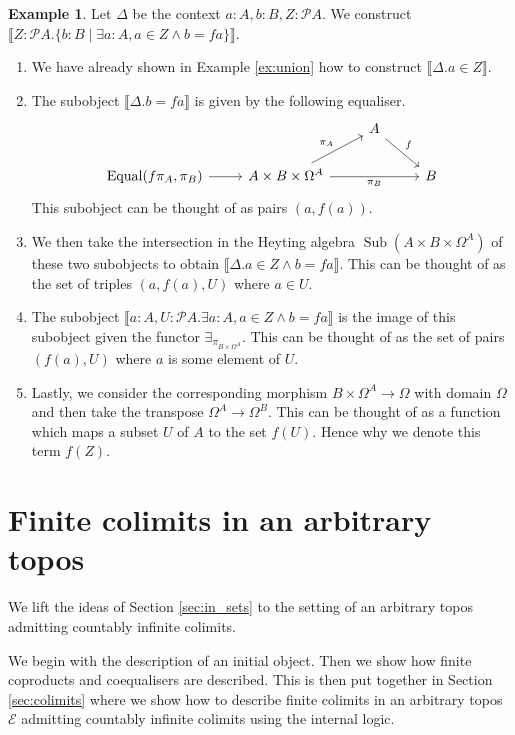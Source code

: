 \documentclass{birkjour}
\theoremstyle{plain}
\theoremstyle{definition}
\newtheorem{example}[thm]{Example}
\newcommand{\call}[1]{\mathcal{#1}}
\newcommand{\lto}{\longrightarrow}
\begin{document}
	\begin{example}
		Let $\Delta$ be the context $a:A, b:B, Z:\call{P}A$. We construct $ \llbracket Z:\call{P}A . \lbrace b:B \mid \exists a:A, a \in Z \wedge b = fa \rbrace\rrbracket$.
		\begin{enumerate}
			\item We have already shown in Example \ref{ex:union} how to construct $\llbracket \Delta. a \in Z\rrbracket$.
			\item The subobject $\llbracket \Delta. b = fa\rrbracket$ is given by the following equaliser.
			\begin{equation}
				\begin{tikzcd}
					& & A\arrow[dr,"{f}"]\\
					\operatorname{Equal}(f\pi_A, \pi_B)\arrow[r] & A \times B \times \Omega^A\arrow[ur,"{\pi_A}"]\arrow[rr,swap,"{\pi_B}"] & & B
				\end{tikzcd}
			\end{equation}
			This subobject can be thought of as pairs $(a,f(a))$.
			\item We then take the intersection in the Heyting algebra $\operatorname{Sub}(A \times B \times \Omega^A)$ of these two subobjects to obtain $\llbracket \Delta. a \in Z \wedge b = fa\rrbracket$. This can be thought of as the set of triples $(a,f(a),U)$ where $a \in U$.
			\item The subobject $\llbracket a:A, U: \call{P}A. \exists a:A, a \in Z \wedge b = fa\rrbracket$ is the image of this subobject given the functor $\exists_{\pi_{B \times \Omega^A}}$. This can be thought of as the set of pairs $(f(a),U)$ where $a$ is some element of $U$.
			\item Lastly, we consider the corresponding morphism $B \times \Omega^A \lto \Omega$ with domain $\Omega$ and then take the transpose $\Omega^A \lto \Omega^B$. This can be thought of as a function which maps a subset $U$ of $A$ to the set $f(U)$. Hence why we denote this term $f(Z)$.
		\end{enumerate}
	\end{example}
	
	\section{Finite colimits in an arbitrary topos}\label{sec:arbitrary_topos}
	We lift the ideas of Section \ref{sec:in_sets} to the setting of an arbitrary topos admitting countably infinite colimits.
	
	We begin with the description of an initial object. Then we show how finite coproducts and coequalisers are described. This is then put together in Section \ref{sec:colimits} where we show how to describe finite colimits in an arbitrary topos $\call{E}$ admitting countably infinite colimits using the internal logic.
	
\end{document}
